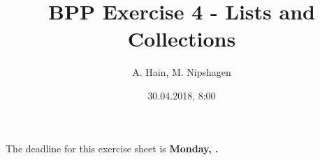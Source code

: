 


\title{BPP Exercise 4 - Lists and Collections}
\author{A. Hain, M. Nipshagen}
\date{30.04.2018, 8:00}

\makeatletter
\let\thetitle\@title
\let\theauthor\@author
\let\thedate\@date
\makeatother

\newcommand\lpb{\small{<}}
\newcommand\rpb{\small{>}}
\newcommand\SubPoint[1]{
  \begin{itemize}
    \item #1
  \end{itemize}
  }
  




The deadline for this exercise sheet is \textbf{Monday, \thedate.}
%
%
